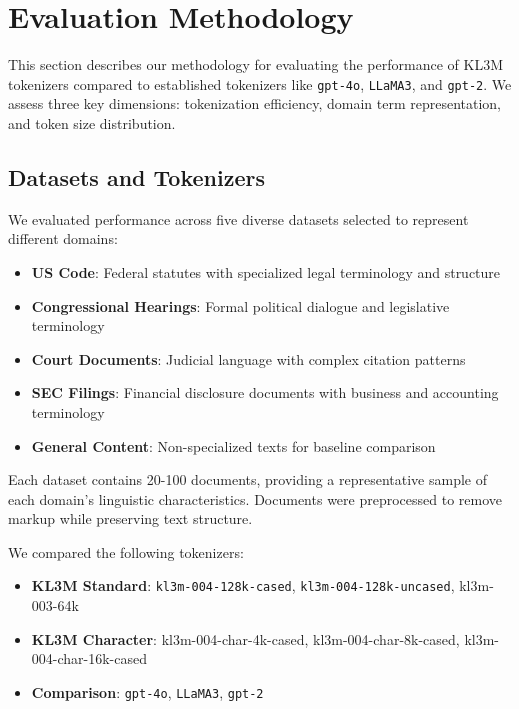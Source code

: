 \section{Evaluation Methodology}
\label{sec:eval}

This section describes our methodology for evaluating the performance of KL3M tokenizers compared to established tokenizers like \texttt{gpt-4o}, \texttt{LLaMA3}, and \texttt{gpt-2}. We assess three key dimensions: tokenization efficiency, domain term representation, and token size distribution.

\subsection{Datasets and Tokenizers}

We evaluated performance across five diverse datasets selected to represent different domains:

\begin{itemize}
    \item \textbf{US Code}: Federal statutes with specialized legal terminology and structure
    \item \textbf{Congressional Hearings}: Formal political dialogue and legislative terminology
    \item \textbf{Court Documents}: Judicial language with complex citation patterns
    \item \textbf{SEC Filings}: Financial disclosure documents with business and accounting terminology
    \item \textbf{General Content}: Non-specialized texts for baseline comparison
\end{itemize}

Each dataset contains 20-100 documents, providing a representative sample of each domain's linguistic characteristics. Documents were preprocessed to remove markup while preserving text structure.

We compared the following tokenizers:
\begin{itemize}
    \item \textbf{KL3M Standard}: \texttt{kl3m-004-128k-cased}, \texttt{kl3m-004-128k-uncased}, kl3m-003-64k
    \item \textbf{KL3M Character}: kl3m-004-char-4k-cased, kl3m-004-char-8k-cased, kl3m-004-char-16k-cased
    \item \textbf{Comparison}: \texttt{gpt-4o}, \texttt{LLaMA3}, \texttt{gpt-2}
\end{itemize}

